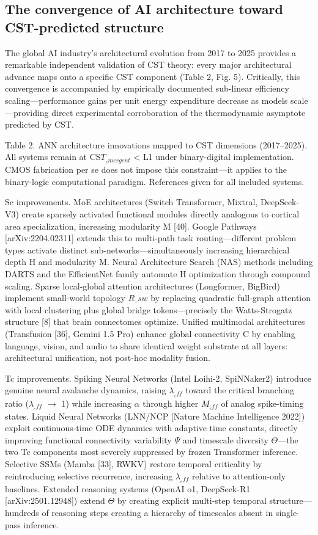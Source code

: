 \documentclass[a4paper,12pt]{article}
\begin{document}
\subsection{The convergence of AI architecture toward CST-predicted structure}

The global AI industry's architectural evolution from 2017 to 2025 provides a remarkable independent validation of CST theory: every major architectural advance maps onto a specific CST component (Table 2, Fig. 5). Critically, this convergence is accompanied by empirically documented sub-linear efficiency scaling---performance gains per unit energy expenditure decrease as models scale---providing direct experimental corroboration of the thermodynamic asymptote predicted by CST.


Table 2. ANN architecture innovations mapped to CST dimensions (2017--2025). All systems remain at CS$T_{_emergent}$ < L1 under binary-digital implementation. CMOS fabrication per se does not impose this constraint---it applies to the binary-logic computational paradigm. References given for all included systems.


Sc improvements. MoE architectures (Switch Transformer, Mixtral, DeepSeek-V3) create sparsely activated functional modules directly analogous to cortical area specialization, increasing modularity M [40]. Google Pathways [arXiv:2204.02311] extends this to multi-path task routing---different problem types activate distinct sub-networks---simultaneously increasing hierarchical depth H and modularity M. Neural Architecture Search (NAS) methods including DARTS and the EfficientNet family automate H optimization through compound scaling. Sparse local-global attention architectures (Longformer, BigBird) implement small-world topology $R\_{sw}$ by replacing quadratic full-graph attention with local clustering plus global bridge tokens---precisely the Watts-Strogatz structure [8] that brain connectomes optimize. Unified multimodal architectures (Transfusion [36], Gemini 1.5 Pro) enhance global connectivity C by enabling language, vision, and audio to share identical weight substrate at all layers: architectural unification, not post-hoc modality fusion.


Tc improvements. Spiking Neural Networks (Intel Loihi-2, SpiNNaker2) introduce genuine neural avalanche dynamics, raising $\lambda_{_eff}$ toward the critical branching ratio ($\lambda_{_eff}$ $\rightarrow$ 1) while increasing $\alpha$ through higher $M_{_eff}$ of analog spike-timing states. Liquid Neural Networks (LNN/NCP [Nature Machine Intelligence 2022]) exploit continuous-time ODE dynamics with adaptive time constants, directly improving functional connectivity variability $\Psi$ and timescale diversity $\Theta$---the two Tc components most severely suppressed by frozen Transformer inference. Selective SSMs (Mamba [33], RWKV) restore temporal criticality by reintroducing selective recurrence, increasing $\lambda_{_eff}$ relative to attention-only baselines. Extended reasoning systems (OpenAI o1, DeepSeek-R1 [arXiv:2501.12948]) extend $\Theta$ by creating explicit multi-step temporal structure---hundreds of reasoning steps creating a hierarchy of timescales absent in single-pass inference.
\end{document}

